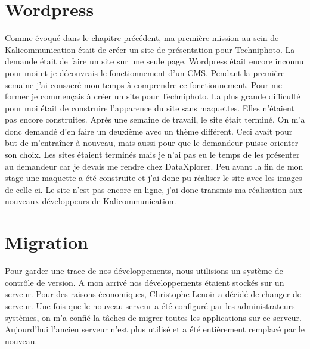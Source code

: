 
\section{Wordpress}
Comme évoqué dans le chapitre précédent, ma première mission au sein de Kalicommunication était de créer un site de présentation pour Techniphoto. La demande était de faire un site sur une seule page. Wordpress était encore inconnu pour moi et je découvrais le fonctionnement d'un CMS. Pendant la première semaine j'ai consacré mon temps à comprendre ce fonctionnement. Pour me former je commençais à créer un site pour Techniphoto. La plus grande difficulté pour moi était de construire l'apparence du site sans maquettes. Elles n'étaient pas encore construites.\newline
Après une semaine de travail, le site était terminé. On m'a donc demandé d'en faire un deuxième avec un thème différent. Ceci avait pour but de m'entraîner à nouveau, mais aussi pour que le demandeur puisse orienter son choix.\newline
Les sites étaient terminés mais je n'ai pas eu le temps de les présenter au demandeur car je devais me rendre chez DataXplorer.
Peu avant la fin de mon stage une maquette a été construite et j'ai donc pu réaliser le site avec les images de celle-ci. Le site n'est pas encore en ligne, j'ai donc transmis ma réalisation aux nouveaux développeurs de Kalicommunication.

\section{Migration}
Pour garder une trace de nos développements, nous utilisions un système de contrôle de version. A mon arrivé nos développements étaient stockés sur un serveur. Pour des raisons économiques, Christophe Lenoir a décidé de changer de serveur. Une fois que le nouveau serveur a été configuré par les administrateurs systèmes, on m'a confié la tâches de migrer toutes les applications sur ce serveur. Aujourd'hui l'ancien serveur n'est plus utilisé et a été entièrement remplacé par le nouveau.


